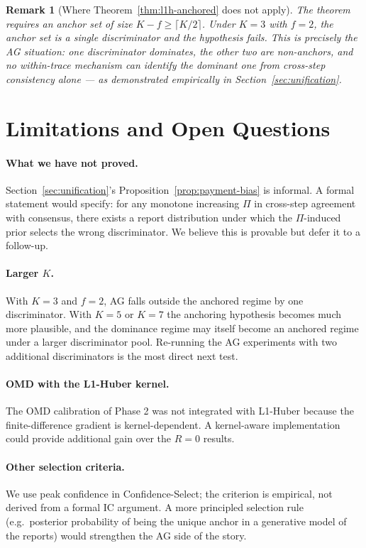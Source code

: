 \documentclass[11pt]{article}
\newtheorem{remark}[theorem]{Remark}
\begin{document}
\begin{remark}[Where Theorem~\ref{thm:l1h-anchored} does not apply]
The theorem requires an anchor set of size $K - f \geq \lceil K/2 \rceil$.
Under $K = 3$ with $f = 2$, the anchor set is a single discriminator and
the hypothesis fails. This is precisely the AG situation: one discriminator
dominates, the other two are non-anchors, and no within-trace mechanism
can identify the dominant one from cross-step consistency alone --- as
demonstrated empirically in Section~\ref{sec:unification}.
\end{remark}

\section{Limitations and Open Questions}

\paragraph{What we have not proved.}
Section~\ref{sec:unification}'s Proposition~\ref{prop:payment-bias} is
informal. A formal statement would specify: for any monotone increasing $\Pi$
in cross-step agreement with consensus, there exists a report distribution
under which the $\Pi$-induced prior selects the wrong discriminator. We
believe this is provable but defer it to a follow-up.

\paragraph{Larger $K$.}
With $K = 3$ and $f = 2$, AG falls outside the anchored regime by one
discriminator. With $K = 5$ or $K = 7$ the anchoring hypothesis becomes much
more plausible, and the dominance regime may itself become an anchored
regime under a larger discriminator pool. Re-running the AG experiments
with two additional discriminators is the most direct next test.

\paragraph{OMD with the L1-Huber kernel.}
The OMD calibration of Phase 2 was not integrated with L1-Huber because the
finite-difference gradient is kernel-dependent. A kernel-aware
implementation could provide additional gain over the $R = 0$ results.

\paragraph{Other selection criteria.}
We use peak confidence in Confidence-Select; the criterion is empirical, not
derived from a formal IC argument. A more principled selection rule
(e.g.\ posterior probability of being the unique anchor in a generative
model of the reports) would strengthen the AG side of the story.
\end{document}
